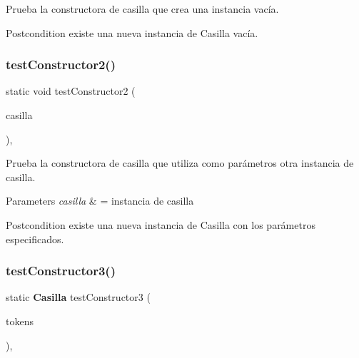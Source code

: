 Prueba la constructora de casilla que crea una instancia vacía. 

\begin{DoxyPostcond}{Postcondition}
existe una nueva instancia de Casilla vacía. 
\end{DoxyPostcond}
\mbox{\label{class_dominio_1_1controladores_1_1_drivers_1_1_driver_casilla_a07e213e48cfc07466abacaf62110c06c}} 
\subsubsection{test\+Constructor2()}
{\footnotesize\ttfamily static void test\+Constructor2 (\begin{DoxyParamCaption}\item[{\textbf{ Casilla}}]{casilla }\end{DoxyParamCaption})\hspace{0.3cm}{\ttfamily [inline]}, {\ttfamily [static]}}



Prueba la constructora de casilla que utiliza como parámetros otra instancia de casilla. 


\begin{DoxyParams}{Parameters}
{\em casilla} & = instancia de casilla \\
\hline
\end{DoxyParams}
\begin{DoxyPostcond}{Postcondition}
existe una nueva instancia de Casilla con los parámetros especificados. 
\end{DoxyPostcond}
\mbox{\label{class_dominio_1_1controladores_1_1_drivers_1_1_driver_casilla_a1c6bae1042c1db321a034e0d3460e9a0}} 
\subsubsection{test\+Constructor3()}
{\footnotesize\ttfamily static \textbf{ Casilla} test\+Constructor3 (\begin{DoxyParamCaption}\item[{String [$\,$]}]{tokens }\end{DoxyParamCaption})\hspace{0.3cm}{\ttfamily [inline]}, {\ttfamily [static]}}



